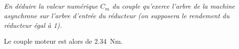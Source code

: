 \documentclass[10pt,fleqn]{article} %
\newif\ifnormal
\begin{document}
\begin{multicols}{2}
\begin{multicols}{2}
\subparagraph{}\textit{En déduire la valeur numérique $C_m$ du couple qu’exerce l’arbre de la machine asynchrone sur l’arbre
d’entrée du réducteur (on supposera le rendement du réducteur égal à 1).}
\ifprof
\begin{corrige}
Le couple moteur est alors de \SI{2,34}{Nm}.
\end{corrige}
\else
\fi



\ifprof
\else

\footnotesize
%

\ifnormal
\vspace{.5cm}

\noindent \textbf{Éléments de corrigé}
\vspace{-.5cm}
\begin{multicols}{2}
\begin{enumerate}
\item \SI{1,26}{rad.s^{-1}}.
\item \SI{1292}{tr.min^{-1}}.
\item Oui.
\item $I$.
\item  $\torseurl{ F_B\vect{x_{2}}}{\vect{0}}{B}$.
\item $ F_B    = \dfrac{mgx_G}{L_2  \sin  \left(\alpha_{12}-\alpha_2\right)} $.
\item $C_{\text{red}}-RF_B \sin \left( \alpha_3 - \alpha_2\right) = 0$.
\item \SI{252}{Nm}.
\item \SI{2,34}{Nm}.
\end{enumerate}
\end{multicols}
\else
\fi
\fi

\normalsize


\ifprof
\end{multicols}
\else
\end{multicols}
\fi
\end{document}

